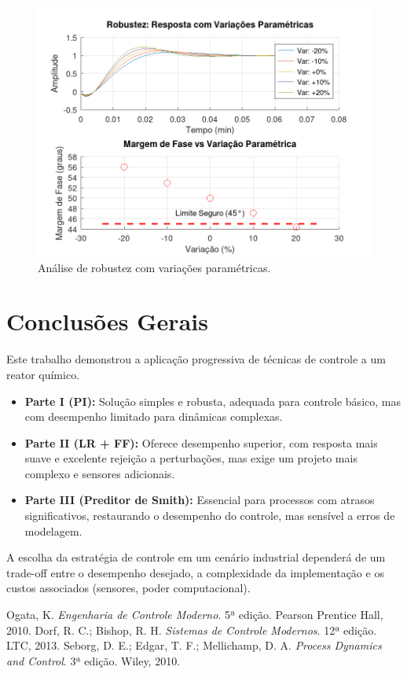 \documentclass[a4paper,12pt]{report}
\begin{document}
\begin{figure}[H]
    \centering
    \includegraphics[width=\textwidth]{figura_analise_robustez.png}
    \caption{Análise de robustez com variações paramétricas.}
    \label{fig:robustez}
\end{figure}

\chapter{Conclusões Gerais}
Este trabalho demonstrou a aplicação progressiva de técnicas de controle a um reator químico.
\begin{itemize}
    \item \textbf{Parte I (PI):} Solução simples e robusta, adequada para controle básico, mas com desempenho limitado para dinâmicas complexas.
    \item \textbf{Parte II (LR + FF):} Oferece desempenho superior, com resposta mais suave e excelente rejeição a perturbações, mas exige um projeto mais complexo e sensores adicionais.
    \item \textbf{Parte III (Preditor de Smith):} Essencial para processos com atrasos significativos, restaurando o desempenho do controle, mas sensível a erros de modelagem.
\end{itemize}
A escolha da estratégia de controle em um cenário industrial dependerá de um trade-off entre o desempenho desejado, a complexidade da implementação e os custos associados (sensores, poder computacional).

\begin{thebibliography}{9}
     Ogata, K. \textit{Engenharia de Controle Moderno}. 5ª edição. Pearson Prentice Hall, 2010.
     Dorf, R. C.; Bishop, R. H. \textit{Sistemas de Controle Modernos}. 12ª edição. LTC, 2013.
     Seborg, D. E.; Edgar, T. F.; Mellichamp, D. A. \textit{Process Dynamics and Control}. 3ª edição. Wiley, 2010.
\end{thebibliography}
\end{document}
